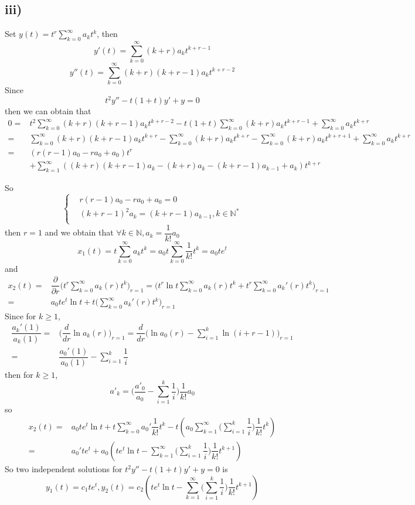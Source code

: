 \documentclass[a4paper,12pt,titlepage]{article}
\begin{document}
\subsection*{iii)}
Set $y(t)=t^r\sum\limits_{k=0}^{\infty}a_kt^k$, then
$$y'(t)=\sum\limits_{k=0}^{\infty}(k+r)a_kt^{k+r-1}$$
$$y''(t)=\sum\limits_{k=0}^{\infty}(k+r)(k+r-1)a_kt^{k+r-2}$$
Since 
$$t^2y''-t(1+t)y'+y=0$$
then we can obtain that
\begin{align*}
0=&t^2\sum\limits_{k=0}^{\infty}(k+r)(k+r-1)a_{k}t^{k+r-2}-t(1+t)\sum\limits_{k=0}^{\infty}(k+r)a_kt^{k+r-1}+\sum\limits_{k=0}^{\infty}a_kt^{k+r}\\
=&\sum\limits_{k=0}^{\infty}(k+r)(k+r-1)a_{k}t^{k+r}-\sum\limits_{k=0}^{\infty}(k+r)a_{k}t^{k+r}-\sum\limits_{k=0}^{\infty}(k+r)a_k t^{k+r+1}+\sum\limits_{k=0}^{\infty}a_k t^{k+r}\\
=&(r(r-1)a_0-ra_0+a_0)t^{r}\\
&+\sum\limits_{k=1}^{\infty}((k+r)(k+r-1)a_{k}-(k+r)a_{k}-(k+r-1)a_{k-1}+a_k)t^{k+r}
\end{align*}

So
$$\left\{
\begin{aligned}
&r(r-1)a_0-ra_0+a_0=0\\
&(k+r-1)^2a_{k}=(k+r-1)a_{k-1},k\in\mathbb{N}^*\\
\end{aligned}
\right.$$
then $r=1$ and we obtain that $\forall k\in\mathbb{N}, a_k=\dfrac{1}{k!}a_0$
$$x_1(t)=t\sum\limits_{k=0}^{\infty}a_kt^k=a_0t\sum\limits_{k=0}^{\infty}\dfrac{1}{k!}t^k=a_0te^t$$
and
\begin{align*}
x_2(t)=&\dfrac{\partial}{\partial r}\Big(t^r\sum\limits_{k=0}^{\infty}a_k(r)t^k\Big)_{r=1}=\Big(t^r\ln t \sum\limits_{k=0}^{\infty}a_k(r)t^k+t^r\sum\limits_{k=0}^{\infty}a_k'(r)t^k\Big)_{r=1}\\
=&a_0te^t\ln t+t\Big(\sum\limits_{k=0}^{\infty}a_k'(r)t^k\Big)_{r=1}
\end{align*}
Since for $k\geqslant1$,
\begin{align*}
\dfrac{a_k'(1)}{a_k(1)}=&\Big(\dfrac{d}{dr}\ln a_k(r)\Big)_{r=1}=\dfrac{d}{dr}\Big(\ln a_0(r)-\sum\limits_{i=1}^k\ln (i+r-1)\Big)_{r=1}\\
=&\dfrac{a_0'(1)}{a_0(1)}-\sum\limits_{i=1}^k\dfrac{1}{i}
\end{align*}
then for $k\geqslant1$,
$$a'_k=\Big(\dfrac{a'_0}{a_0}-\sum\limits_{i=1}^k\dfrac{1}{i}\Big)\dfrac{1}{k!}a_0$$
so
\begin{align*}
x_2(t)=&a_0te^t\ln t+t\sum\limits_{k=0}^{\infty}a_0'\dfrac{1}{k!}t^k-t(a_0\sum\limits_{k=1}^{\infty}\Big(\sum\limits_{i=1}^k\dfrac{1}{i}\Big)\dfrac{1}{k!}t^k)\\
=&a_0'te^t+a_0(te^t\ln t-\sum\limits_{k=1}^{\infty}\Big(\sum\limits_{i=1}^k\dfrac{1}{i}\Big)\dfrac{1}{k!}t^{k+1})
\end{align*}
So two independent solutions for $t^2y''-t(1+t)y'+y=0$ is
$$y_1(t)=c_1te^t,y_2(t)=c_2(te^t\ln t-\sum\limits_{k=1}^{\infty}\Big(\sum\limits_{i=1}^k\dfrac{1}{i}\Big)\dfrac{1}{k!}t^{k+1})$$
\end{document}
